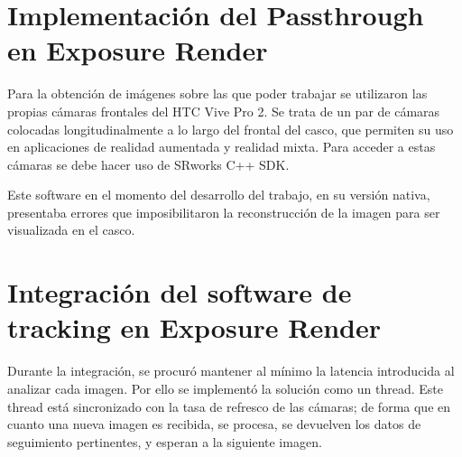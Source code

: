 \section{Implementación del Passthrough en Exposure Render}
Para la obtención de imágenes sobre las que poder trabajar se utilizaron las propias cámaras frontales del HTC Vive Pro 2. Se trata de un par de cámaras colocadas longitudinalmente a lo largo del frontal del casco, que permiten su uso en aplicaciones de realidad aumentada y realidad mixta. 
Para acceder a estas cámaras se debe hacer uso de SRworks C++ SDK.

Este software en el momento del desarrollo del trabajo, en su versión nativa, presentaba errores que imposibilitaron la reconstrucción de la imagen para ser visualizada en el casco.
\section{Integración del software de tracking en Exposure Render}
Durante la integración, se procuró mantener al mínimo la latencia introducida al analizar cada imagen. Por ello se implementó la solución como un thread. Este thread está sincronizado con la tasa de refresco de las cámaras; de forma que en cuanto una nueva imagen es recibida, se procesa, se devuelven los datos de seguimiento pertinentes, y esperan a la siguiente imagen.